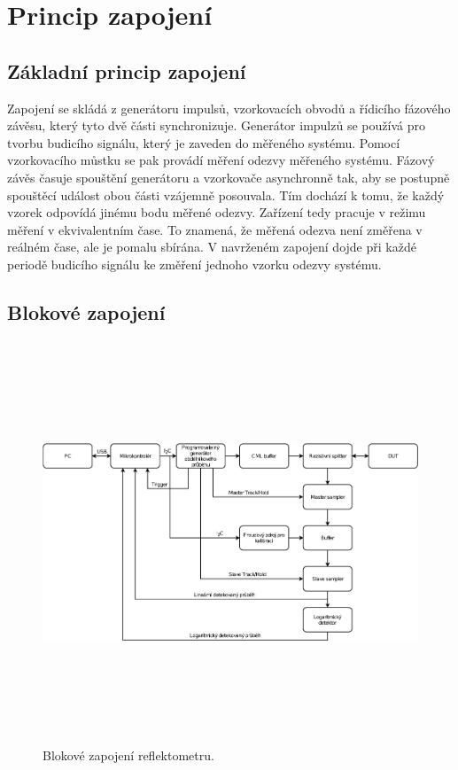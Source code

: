 \chapter{Princip zapojení}

\section{Základní princip zapojení}
Zapojení se skládá z generátoru impulsů, vzorkovacích obvodů a řídicího fázového závěsu, který tyto dvě části synchronizuje. Generátor impulzů se používá pro tvorbu budicího signálu, který je zaveden do měřeného systému. Pomocí vzorkovacího můstku se pak provádí měření odezvy měřeného systému. Fázový závěs časuje spouštění generátoru a vzorkovače asynchronně tak, aby se postupně spouštěcí událost obou části vzájemně posouvala. Tím dochází k tomu, že každý vzorek odpovídá jinému bodu měřené odezvy. Zařízení tedy pracuje v režimu měření v ekvivalentním čase. To znamená, že měřená odezva není změřena v reálném čase, ale je pomalu sbírána. V navrženém zapojení dojde při každé periodě budicího signálu ke změření jednoho vzorku odezvy systému.

\section{Blokové zapojení}
\begin{figure}[htbp]
\includegraphics[width=\textwidth,height=12cm,keepaspectratio]{images/block_diagram.eps}\caption{Blokové zapojení reflektometru.} \label{block_diagram}
\end{figure}

